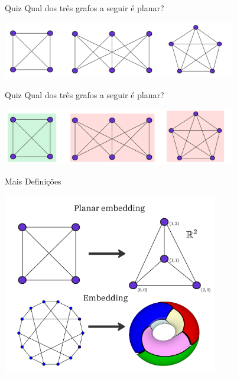 \begin{frame}{Quiz}
  \centering
  \Large
  Qual dos três grafos a seguir é planar?
  \bigbreak
  \begin{minipage}{\linewidth}
    \centering
    \includegraphics[height=2.5cm]{images/quiz_1.jpg}
  \end{minipage}
\end{frame}

\begin{frame}{Quiz}
  \centering
  \Large
  Qual dos três grafos a seguir é planar?
  \bigbreak
  \begin{minipage}{\linewidth}
    \centering
    \includegraphics[height=2.5cm]{images/quiz_1_solved.jpg}
  \end{minipage}
\end{frame}

\begin{frame}{Mais Definições}
    \begin{minipage}{\linewidth}
        \centering
        \includegraphics[height=8cm]{images/embedding.jpg}
    \end{minipage}
\end{frame}

